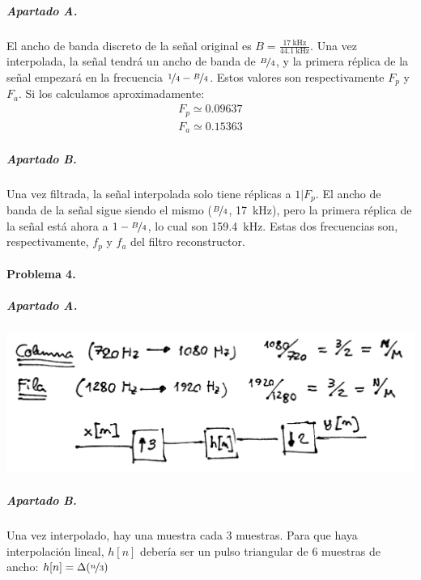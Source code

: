 \subparagraph{Apartado A.}

El ancho de banda discreto de la señal original es $B =
\frac{\SI{17}{\kilo\hertz}}{\SI{44.1}{\kilo\hertz}}$. Una vez interpolada,
la señal tendrá un ancho de banda de $\nicefrac{B}{4}$, y la primera réplica de
la señal empezará en la frecuencia $\nicefrac{1}{4} - \nicefrac{B}{4}$. Estos
valores son respectivamente $F_p$ y $F_a$. Si los calculamos aproximadamente:
%
\begin{align*}
  F_p \simeq \num{0.09637} \\
  F_a \simeq \num{0.15363}
\end{align*}

\subparagraph{Apartado B.}

Una vez filtrada, la señal interpolada solo tiene réplicas a $1 | F_p$.
El ancho de banda de la señal sigue siendo el mismo ($\nicefrac{B}{4}$,
\SI{17}{\kilo\hertz}), pero la primera réplica de la señal está ahora a
$1 - \nicefrac{B}{4}$, lo cual son \SI{159.4}{\kilo\hertz}. Estas dos
frecuencias son, respectivamente, $f_p$ y $f_a$ del filtro reconstructor.

\finishpage
\startpage

\paragraph{Problema 4.}

\subparagraph{Apartado A.} \hspace{1em}

\includegraphics[width=\textwidth]{T7-p4a}

\subparagraph{Apartado B.}

Una vez interpolado, hay una muestra cada 3 muestras. Para que haya
interpolación lineal, $h[n]$ debería ser un pulso triangular de 6 muestras de
ancho: $h[n] = \Delta(\nicefrac{n}{3})$

\finishpage

